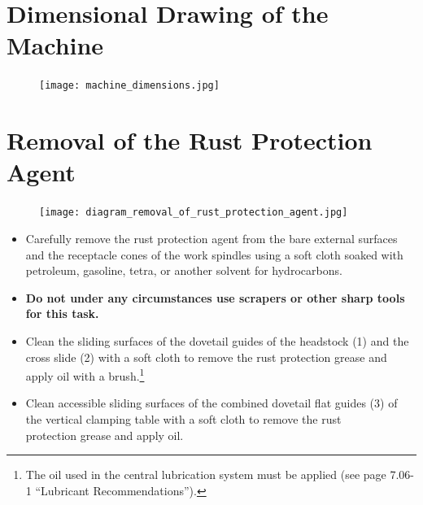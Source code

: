 \section{Dimensional Drawing of the Machine}

\begin{figure}[H]
    \centering
    \texttt{[image: machine\_dimensions.jpg]}
    \caption{}
    \label{fig:setup_plan_workspace_layout}
\end{figure}


\section{Removal of the Rust Protection Agent}

\setcounter{section}{8}


\begin{figure}[h]
    \centering
    \texttt{[image: diagram\_removal\_of\_rust\_protection\_agent.jpg]}
    \caption{}
\end{figure}

\begin{itemize}
    \item Carefully remove the rust protection agent from the bare external surfaces and the receptacle cones of the work spindles using a soft cloth soaked with petroleum, gasoline, tetra, or another solvent for hydrocarbons.
    \item \textbf{Do not under any circumstances use scrapers or other sharp tools for this task.}
    \item Clean the sliding surfaces of the dovetail guides of the headstock (1) and the cross slide (2) with a soft cloth to remove the rust protection grease and apply oil with a brush.\footnote{The oil used in the central lubrication system must be applied (see page 7.06-1 \enquote{Lubricant Recommendations}).}
    \item Clean accessible sliding surfaces of the combined dovetail flat guides (3) of the vertical clamping table with a soft cloth to remove the rust\\ protection grease and apply oil.
\end{itemize}

